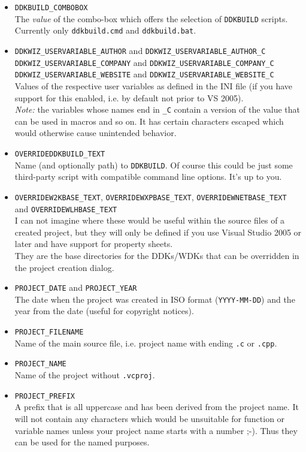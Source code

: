 \documentclass[a4paper,titlepage]{report}
\begin{document}
\begin{itemize}
  \item \verb+DDKBUILD_COMBOBOX+\\
        The \emph{value} of the combo-box which offers the selection of \texttt{DDKBUILD}
        scripts. Currently only \texttt{ddkbuild.cmd} and \texttt{ddkbuild.bat}.
  \item \verb+DDKWIZ_USERVARIABLE_AUTHOR+ and \verb+DDKWIZ_USERVARIABLE_AUTHOR_C+\\
        \verb+DDKWIZ_USERVARIABLE_COMPANY+ and \verb+DDKWIZ_USERVARIABLE_COMPANY_C+\\
        \verb+DDKWIZ_USERVARIABLE_WEBSITE+ and \verb+DDKWIZ_USERVARIABLE_WEBSITE_C+\\
        Values of the respective user variables as defined in the INI file (if
        you have support for this enabled, i.e. by default not prior to VS 2005).\\
        \emph{Note:} the variables whose names end in \verb+_C+ contain a version
        of the value that can be used in macros and so on. It has certain characters
        escaped which would otherwise cause unintended behavior.
  \item \verb+OVERRIDEDDKBUILD_TEXT+\\
        Name (and optionally path) to \texttt{DDKBUILD}. Of course this could be
        just some third-party script with compatible command line options. It's up
        to you.
  \item \verb+OVERRIDEW2KBASE_TEXT+, \verb+OVERRIDEWXPBASE_TEXT+, \verb+OVERRIDEWNETBASE_TEXT+ and \verb+OVERRIDEWLHBASE_TEXT+\\
        I can not imagine where these would be useful within the source files of a
        created project, but they will only be defined if you use Visual Studio 2005
        or later and have support for property sheets.\\
        They are the base directories for the DDKs/WDKs that can be overridden in
        the project creation dialog.
  \item \verb+PROJECT_DATE+ and \verb+PROJECT_YEAR+\\
        The date when the project was created in ISO format (\texttt{YYYY-MM-DD})
        and the year from the date (useful for copyright notices).
  \item \verb+PROJECT_FILENAME+\\
        Name of the main source file, i.e. project name with ending \texttt{.c} or \texttt{.cpp}.
  \item \verb+PROJECT_NAME+\\
        Name of the project without \texttt{.vcproj}.
  \item \verb+PROJECT_PREFIX+\\
        A prefix that is all uppercase and has been derived from the project name.
        It will not contain any characters which would be unsuitable for function
        or variable names unless your project name starts with a number \textsf{;-)}.
        Thus they can be used for the named purposes.
\end{itemize}
\end{document}
